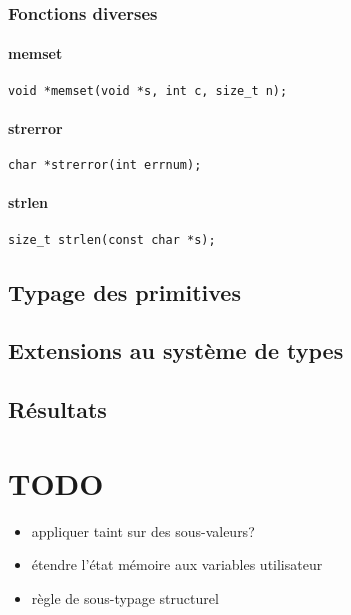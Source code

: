 \subsubsection{Fonctions diverses}

\paragraph{memset}
\begin{Verbatim}
void *memset(void *s, int c, size_t n);
\end{Verbatim}
\paragraph{strerror}
\begin{Verbatim}
char *strerror(int errnum);
\end{Verbatim}
\paragraph{strlen}
\begin{Verbatim}
size_t strlen(const char *s);
\end{Verbatim}

\subsection{Typage des primitives}

\subsection{Extensions au système de types}

\subsection{Résultats}

\section*{TODO}

\begin{itemize}
\item appliquer taint sur des sous-valeurs?
\item étendre l'état mémoire aux variables utilisateur
\item règle de sous-typage structurel
\end{itemize}

